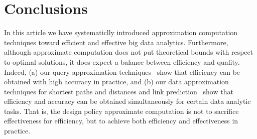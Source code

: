 \section{Conclusions}
\label{sec-conclusion}

In this article we have systematiclly introduced approximation computation techniques toward efficient and effective big data analytics.
Furthermore, although approximate computation does not put
theoretical bounds with respect to optimal solutions, it does expect a balance between efficiency and quality. Indeed, (a) our query approximation techniques~\cite{tods-MaCFHW14,LinMZWH17,MaHWLH17} show that efficiency can be obtained with high accuracy in practice, and (b) our data approximation techniques for shortest paths and distances and link prediction~\cite{MaFLWCH16,DuanMAMH17} show that efficiency and accuracy can be obtained simultaneously for certain data analytic tasks. That is, the design policy approximate computation is not to sacrifice effectiveness for efficiency, but to achieve both efficiency and effectiveness in practice.

